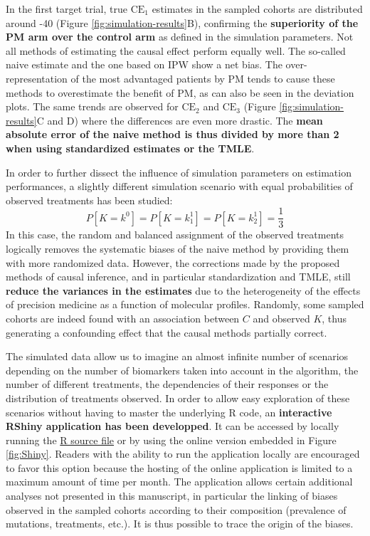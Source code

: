 \documentclass[a4paper,12pt,twoside,onecolumn,openright,final,oldfontcommands]{memoir}
\begin{document}
In the first target trial, true \(\text{CE}_1\) estimates in the sampled
cohorts are distributed around -40 (Figure
\ref{fig:simulation-results}B), confirming the \textbf{superiority of
the PM arm over the control arm} as defined in the simulation
parameters. Not all methods of estimating the causal effect perform
equally well. The so-called naive estimate and the one based on IPW show
a net bias. The over-representation of the most advantaged patients by
PM tends to cause these methods to overestimate the benefit of PM, as
can also be seen in the deviation plots. The same trends are observed
for \(\text{CE}_2\) and \(\text{CE}_3\) (Figure
\ref{fig:simulation-results}C and D) where the differences are even more
drastic. The \textbf{mean absolute error of the naive method is thus
divided by more than 2 when using standardized estimates or the TMLE}.

In order to further dissect the influence of simulation parameters on
estimation performances, a slightly different simulation scenario with
equal probabilities of observed treatments has been studied:
\[P[K=k^0]=P[K=k^1_1]=P[K=k^1_2]=\dfrac{1}{3}\] In this case, the random
and balanced assignment of the observed treatments logically removes the
systematic biases of the naive method by providing them with more
randomized data. However, the corrections made by the proposed methods
of causal inference, and in particular standardization and TMLE, still
\textbf{reduce the variances in the estimates} due to the heterogeneity
of the effects of precision medicine as a function of molecular
profiles. Randomly, some sampled cohorts are indeed found with an
association between \(C\) and observed \(K\), thus generating a
confounding effect that the causal methods partially correct.

The simulated data allow us to imagine an almost infinite number of
scenarios depending on the number of biomarkers taken into account in
the algorithm, the number of different treatments, the dependencies of
their responses or the distribution of treatments observed. In order to
allow easy exploration of these scenarios without having to master the
underlying R code, an \textbf{interactive RShiny application has been
developped}. It can be accessed by locally running the
\href{https://github.com/JonasBeal/Causal_Precision_Medicine/blob/master/Application_Causal_PM.R}{R
source file} or by using the online version embedded in Figure
\ref{fig:Shiny}. Readers with the ability to run the application locally
are encouraged to favor this option because the hosting of the online
application is limited to a maximum amount of time per month. The
application allows certain additional analyses not presented in this
manuscript, in particular the linking of biases observed in the sampled
cohorts according to their composition (prevalence of mutations,
treatments, etc.). It is thus possible to trace the origin of the
biases.
\end{document}
